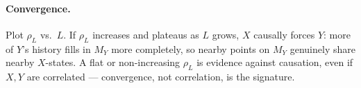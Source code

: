 \paragraph{Convergence.} Plot $\rho_L$ vs.\ $L$. If $\rho_L$ increases
and plateaus as $L$ grows, $X$ causally forces $Y$: more of $Y$'s
history fills in $M_Y$ more completely, so nearby points on $M_Y$
genuinely share nearby $X$-states. A flat or non-increasing $\rho_L$
is evidence against causation, even if $X,Y$ are correlated ---
convergence, not correlation, is the signature.

